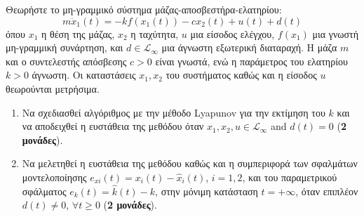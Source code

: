 \documentclass[a4paper,11pt]{article}
\begin{document}
\begin{question}
Θεωρήστε το μη-γραμμικό σύστημα μάζας-αποσβεστήρα-ελατηρίου:
\begin{equation}
    m \ddot{x}_1(t) = -k f(x_1(t)) - c x_2(t) + u(t) + d(t)
\end{equation}
όπου $x_1$ η θέση της μάζας, $x_2$ η ταχύτητα, $u$ μια είσοδος ελέγχου, $f(x_1)$ μια γνωστή μη-γραμμική συνάρτηση, και $d \in \mathcal{L}_\infty$ μια άγνωστη εξωτερική διαταραχή. Η μάζα $m$ και ο συντελεστής απόσβεσης $c > 0$ είναι γνωστά, ενώ η παράμετρος του ελατηρίου $k > 0$ άγνωστη. Οι καταστάσεις $x_1, x_2$ του συστήματος καθώς και η είσοδος $u$ θεωρούνται μετρήσιμα.

\begin{enumerate}[label=\roman*)]
    \item Να σχεδιασθεί αλγόριθμος με την μέθοδο Lyapunov για την εκτίμηση του $k$ και να αποδειχθεί η ευστάθεια της μεθόδου όταν $x_1, x_2, u \in \mathcal{L}_\infty$ and $d(t) = 0$ (\textbf{2 μονάδες}).
    \item Να μελετηθεί η ευστάθεια της μεθόδου καθώς και η συμπεριφορά των σφαλμάτων μοντελοποίησης $e_{xi}(t) = x_i(t) - \hat{x}_i(t)$, $i = 1, 2$, και του παραμετρικού σφάλματος $e_k(t) = \hat{k}(t) - k$, στην μόνιμη κατάσταση $t = +\infty$, όταν επιπλέον $d(t) \ne 0$, $\forall t \ge 0$ (\textbf{2 μονάδες}).
\end{enumerate}
\end{question}
\end{document}
